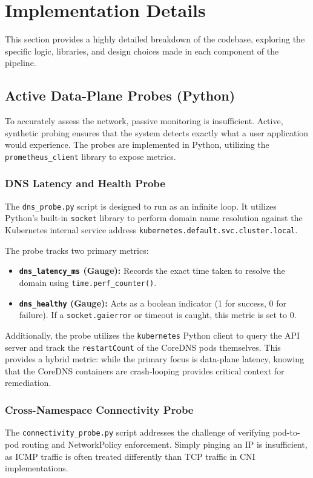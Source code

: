 \documentclass[12pt,a4paper]{article}
\begin{document}
\newpage

\section{Implementation Details}
\onehalfspacing
This section provides a highly detailed breakdown of the codebase, exploring the specific logic, libraries, and design choices made in each component of the pipeline.

\subsection{Active Data-Plane Probes (Python)}
To accurately assess the network, passive monitoring is insufficient. Active, synthetic probing ensures that the system detects exactly what a user application would experience. The probes are implemented in Python, utilizing the \texttt{prometheus\_client} library to expose metrics.

\subsubsection{DNS Latency and Health Probe}
The \texttt{dns\_probe.py} script is designed to run as an infinite loop. It utilizes Python's built-in \texttt{socket} library to perform domain name resolution against the Kubernetes internal service address \texttt{kubernetes.default.svc.cluster.local}. 

The probe tracks two primary metrics:
\begin{itemize}
    \item \textbf{\texttt{dns\_latency\_ms} (Gauge):} Records the exact time taken to resolve the domain using \texttt{time.perf\_counter()}.
    \item \textbf{\texttt{dns\_healthy} (Gauge):} Acts as a boolean indicator (1 for success, 0 for failure). If a \texttt{socket.gaierror} or timeout is caught, this metric is set to 0.
\end{itemize}

Additionally, the probe utilizes the \texttt{kubernetes} Python client to query the API server and track the \texttt{restartCount} of the CoreDNS pods themselves. This provides a hybrid metric: while the primary focus is data-plane latency, knowing that the CoreDNS containers are crash-looping provides critical context for remediation.

\subsubsection{Cross-Namespace Connectivity Probe}
The \texttt{connectivity\_probe.py} script addresses the challenge of verifying pod-to-pod routing and NetworkPolicy enforcement. Simply pinging an IP is insufficient, as ICMP traffic is often treated differently than TCP traffic in CNI implementations.
\end{document}
